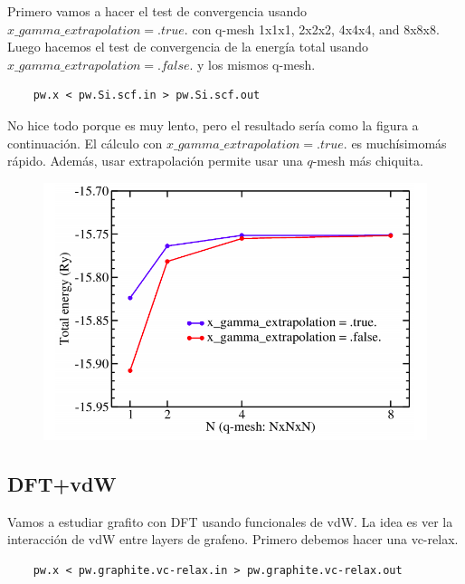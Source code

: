 
  Primero vamos a hacer el test de convergencia usando $x\_gamma\_extrapolation = .true.$ con q-mesh 1x1x1, 2x2x2, 4x4x4, and 8x8x8. Luego hacemos el test de convergencia de la energía total usando $x\_gamma\_extrapolation = .false.$ y los mismos q-mesh.
  \begin{verbatim}
    pw.x < pw.Si.scf.in > pw.Si.scf.out
  \end{verbatim}

  No hice todo porque es muy lento, pero el resultado sería como la figura a continuación. El cálculo con $x\_gamma\_extrapolation = .true.$ es muchísimomás rápido. Además, usar extrapolación permite usar una $q$-mesh más chiquita.

  \begin{figure}[H]
      \centering
      \includegraphics[scale = 0.5]{figs/D4/hibridos.png}
  \end{figure}

\subsection{DFT+vdW}

  Vamos a estudiar grafito con DFT usando funcionales de vdW. La idea es ver la interacción de vdW entre layers de grafeno. Primero debemos hacer una vc-relax.
  \begin{verbatim}
    pw.x < pw.graphite.vc-relax.in > pw.graphite.vc-relax.out
  \end{verbatim}


